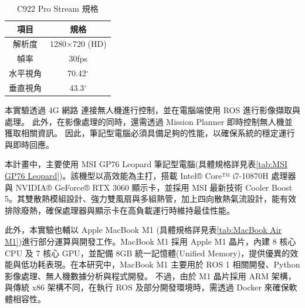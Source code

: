 \documentclass[12pt]{article}       %
\begin{document}
\begin{table}[ht]
    \caption{C922 Pro Stream 規格}
    \vspace{12pt} %
    \renewcommand{\arraystretch}{1.5} %
    \centering
    \begin{tabular}{|c|c|}
        \hline
        項目   & 規格              \\ \hline
        解析度  & 1280$\times$720 (HD) \\ \hline
        幀率   & 30fps           \\ \hline
        水平視角 & 70.42$^\circ$         \\ \hline
        垂直視角 & 43.3$^\circ$           \\ \hline
    \end{tabular}
    \label{tab:C922 Pro}
\end{table}

本實驗透過 4G 網路 連接無人機進行控制，並在電腦端使用 ROS 進行影像擷取與處理。
此外，在影像處理的同時，還需透過 Mission Planner \cite{pixhawk_2023}即時控制無人機並獲取相關資訊。
因此，筆記型電腦必須具備足夠的性能，以確保系統的穩定運行與即時回應。

本計畫中，主要使用 MSI GP76 Leopard 筆記型電腦(具體規格詳見表\ref{tab:MSI GP76 Leopard})。該機型以高效能為主打，搭載 Intel® Core™ i7-10870H 處理器與 NVIDIA® GeForce® RTX 3060 顯示卡，並採用 MSI 最新技術 Cooler Boost 5。其雙散熱模組設計、強力雙風扇與多組熱管，加上四向散熱氣流設計，能有效排除廢熱，確保處理器與顯示卡在高負載運行時維持最佳性能。

此外，本實驗也輔以 Apple MacBook M1 (具體規格詳見表\ref{tab:MacBook Air M1})進行部分運算與開發工作。MacBook M1 採用 Apple M1 晶片，內建 8 核心 CPU 及 7 核心 GPU，並配備 8GB 統一記憶體(Unified Memory)，提供優異的效能與低功耗表現。在本研究中，MacBook M1 主要用於 ROS 1 相關開發、Python 影像處理、無人機數據分析與程式開發。
不過，由於 M1 晶片採用 ARM 架構，與傳統 x86 架構不同，在執行 ROS 及部分開發環境時，需透過 Docker 來確保軟體相容性。
\end{document}
